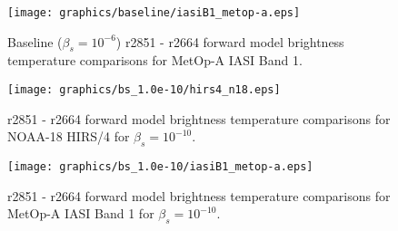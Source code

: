 \begin{figure}[htb]
  \centering
  \texttt{[image: graphics/baseline/iasiB1\_metop-a.eps]}
  \caption{Baseline ($\beta_s = 10^{-6}$) r2851 - r2664 forward model brightness temperature comparisons for MetOp-A IASI Band 1.}
  \label{fig:baseline_iasiB1_metop-a}
\end{figure}

\begin{figure}[htb]
  \centering
  \texttt{[image: graphics/bs\_1.0e-10/hirs4\_n18.eps]}
  \caption{r2851 - r2664 forward model brightness temperature comparisons for NOAA-18 HIRS/4 for $\beta_s = 10^{-10}$.}
  \label{fig:bs_1.0e-10_hirs4_n18}
\end{figure}


\begin{figure}[htb]
  \centering
  \texttt{[image: graphics/bs\_1.0e-10/iasiB1\_metop-a.eps]}
  \caption{r2851 - r2664 forward model brightness temperature comparisons for MetOp-A IASI Band 1 for $\beta_s = 10^{-10}$.}
  \label{fig:bs_1.0e-10_iasiB1_metop-a}
\end{figure}
